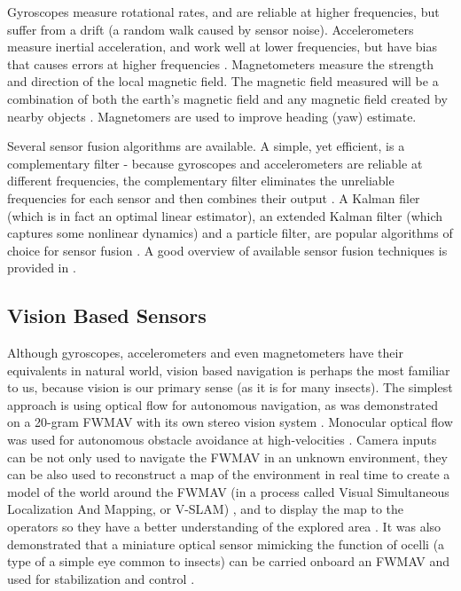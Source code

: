 Gyroscopes measure rotational rates, and are reliable at higher frequencies, but suffer from a drift (a random walk caused by sensor noise). Accelerometers measure inertial acceleration, and work well at lower frequencies, but have bias that causes errors at higher frequencies \cite{Jensen2013}. Magnetometers measure the strength and direction of the local magnetic field. The magnetic field measured will be a combination of both the earth's magnetic field and any magnetic field created by nearby objects \cite{vectornav}. Magnetomers are used to improve heading (yaw) estimate.

Several sensor fusion algorithms are available. A simple, yet efficient, is a complementary filter - because gyroscopes and accelerometers are reliable at different frequencies, the complementary filter eliminates the unreliable frequencies for each sensor and then combines their output \cite{Jensen2013}. A Kalman filer (which is in fact an optimal linear estimator), an extended Kalman filter (which captures some nonlinear dynamics) and a particle filter, are popular algorithms of choice for sensor fusion \cite{simon_optimal_2006}. A good overview of available sensor fusion techniques is provided in \cite{Barton2012}.

\subsection{Vision Based Sensors}
\label{subsec:vision_based_sensors}
Although gyroscopes, accelerometers and even magnetometers have their equivalents in natural world, vision based navigation is perhaps the most familiar to us, because vision is our primary sense (as it is for many insects). The simplest approach is using optical flow for autonomous navigation, as was demonstrated on a 20-gram FWMAV with its own stereo vision system \cite{DeWagter2014}. Monocular optical flow was used for autonomous obstacle avoidance at high-velocities \cite{Barry2014}. Camera inputs can be not only used to navigate the FWMAV in an unknown environment, they can be also used to reconstruct a map of the environment in real time to create a model of the world around the FWMAV (in a process called Visual Simultaneous Localization And Mapping, or V-SLAM) \cite{Bibuli2007}, and to display the map to the operators so they have a better understanding of the explored area \cite{Bibuli2007a}. It was also demonstrated that a miniature optical sensor mimicking the function of ocelli (a type of a simple eye common to insects) can be carried onboard an FWMAV and used for stabilization and control \cite{Fuller2014}.

